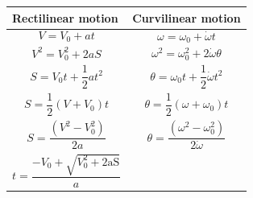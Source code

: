 \documentclass[
]{book}
\begin{document}
\begin{longtable}[]{@{}ll@{}}
\toprule
\begin{minipage}[b]{0.37\columnwidth}\raggedright
Rectilinear motion\strut
\end{minipage} & \begin{minipage}[b]{0.57\columnwidth}\raggedright
Curvilinear motion\strut
\end{minipage}\tabularnewline
\midrule
\endhead
\begin{minipage}[t]{0.37\columnwidth}\raggedright
\[V = V_0 + at\]\strut
\end{minipage} & \begin{minipage}[t]{0.57\columnwidth}\raggedright
\[\omega = \omega_0 + \dot{\omega} t\]\strut
\end{minipage}\tabularnewline
\begin{minipage}[t]{0.37\columnwidth}\raggedright
\[V^2 = V_0^2 + 2aS\]\strut
\end{minipage} & \begin{minipage}[t]{0.57\columnwidth}\raggedright
\[\omega^2 = \omega_0^2 + 2 \dot{\omega}\theta\]\strut
\end{minipage}\tabularnewline
\begin{minipage}[t]{0.37\columnwidth}\raggedright
\[S = V_0 t + \frac{1}{2} a t^2\]\strut
\end{minipage} & \begin{minipage}[t]{0.57\columnwidth}\raggedright
\[\theta = \omega_0 t + \frac{1}{2} \dot{\omega} t^2\]\strut
\end{minipage}\tabularnewline
\begin{minipage}[t]{0.37\columnwidth}\raggedright
\[S = \frac{1}{2}(V + V_0) t\]\strut
\end{minipage} & \begin{minipage}[t]{0.57\columnwidth}\raggedright
\[\theta = \frac{1}{2}(\omega + \omega_0)t\]\strut
\end{minipage}\tabularnewline
\begin{minipage}[t]{0.37\columnwidth}\raggedright
\[S = \frac{\left( V^{2} - V_{0}^{2} \right)}{2a}\]\strut
\end{minipage} & \begin{minipage}[t]{0.57\columnwidth}\raggedright
\[\theta = \frac{\left( \omega^{2} - \omega_{0}^{2} \right)}{2\dot{\omega}}\]\strut
\end{minipage}\tabularnewline
\begin{minipage}[t]{0.37\columnwidth}\raggedright
\[t = \frac{- V_{0} + \sqrt{V_{0}^{2} + 2\text{aS}}}{a}\]\strut

\end{minipage}
\end{longtable}
\end{document}
